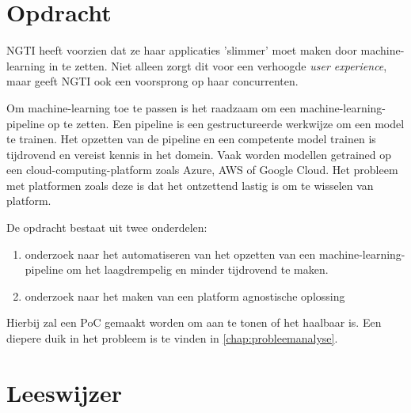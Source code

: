 \section{Opdracht}
NGTI heeft voorzien dat ze haar applicaties 'slimmer' moet maken door \gls{machine-learning} in te zetten. Niet alleen zorgt dit voor een verhoogde \textit{user experience}, maar geeft NGTI ook een voorsprong op haar concurrenten.

Om \gls{machine-learning} toe te passen is het raadzaam om een \gls{machine-learning-pipeline} op te zetten. Een pipeline is een gestructureerde werkwijze om een model te trainen. Het opzetten van de pipeline en een competente model trainen is tijdrovend en vereist kennis in het domein. Vaak worden modellen getrained op een \gls{cloud-computing-platform} zoals Azure, AWS of Google Cloud. Het probleem met platformen zoals deze is dat het ontzettend lastig is om te wisselen van platform.\bigskip\bigskip\bigskip\bigskip\bigskip

De opdracht bestaat uit twee onderdelen:
\begin{enumerate}
  \item onderzoek naar het automatiseren van het opzetten van een \gls{machine-learning-pipeline} om het laagdrempelig en minder tijdrovend te maken.
  \item onderzoek naar het maken van een platform agnostische oplossing
\end{enumerate}

Hierbij zal een PoC gemaakt worden om aan te tonen of het haalbaar is. Een diepere duik in het probleem is te vinden in \autoref{chap:probleemanalyse}.

\section{Leeswijzer}
